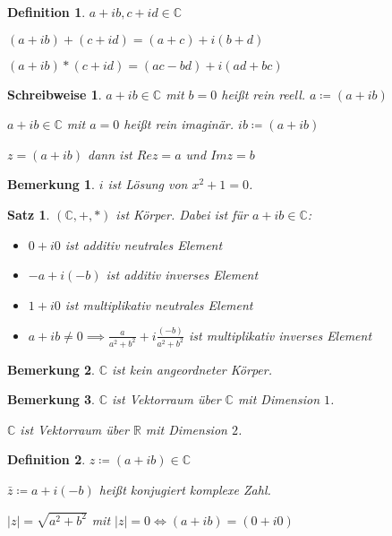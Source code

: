 \documentclass[twocolumn]{article}
\newtheorem{theorem}{Satz}[section]
\newtheorem{definition}{Definition}[section]
\newtheorem*{remark}{Bemerkung}
\newtheorem*{schreibweise}{Schreibweise}
\newcommand*{\logeq}{\Leftrightarrow}
\begin{document}
\begin{definition}
	$a+ib,c+id \in \mathbb{C}$
	
	$(a+ib)+(c+id)=(a+c)+i(b+d)$
	
	$(a+ib)*(c+id)=(ac-bd)+i(ad+bc)$
\end{definition}

\begin{schreibweise}
	$a+ib \in \mathbb{C}$ mit $b=0$ heißt rein reell. $a\coloneqq (a+ib)$
	
	$a+ib \in \mathbb{C}$ mit $a=0$ heißt rein imaginär. $ib\coloneqq (a+ib)$
	
	$z=(a+ib)$ dann ist $Rez=a$ und $Imz=b$
\end{schreibweise}

\begin{remark}
	$i$ ist Lösung von $x^{2}+1=0$.
\end{remark}

\begin{theorem}
	$(\mathbb{C},+,*)$ ist Körper. Dabei ist für $a+ib \in \mathbb{C}$:
	
	\begin{itemize}
		\item $0+i0$ ist additiv neutrales Element
		\item $-a+i(-b)$ ist additiv inverses Element
		\item $1+i0$ ist multiplikativ neutrales Element
		\item $a+ib\neq 0 \implies \frac{a}{a^{2}+b^{2}}+i\frac{(-b)}{a^{2}+b^{2}}$ ist multiplikativ inverses Element
	\end{itemize}
\end{theorem}

\begin{remark}
	$\mathbb{C}$ ist kein angeordneter Körper.
\end{remark}

\begin{remark}
	$\mathbb{C}$ ist Vektorraum über $\mathbb{C}$ mit Dimension $1$.
	
	$\mathbb{C}$ ist Vektorraum über $\mathbb{R}$ mit Dimension $2$.
\end{remark}

\begin{definition}
	$z\coloneqq (a+ib) \in \mathbb{C}$
	
	$\bar{z}\coloneqq a+i(-b)$ heißt konjugiert komplexe Zahl.
	
	$|z|=\sqrt{a^{2}+b^{2}}$ mit $|z|=0 \logeq (a+ib)=(0+i0)$
\end{definition}
\end{document}
